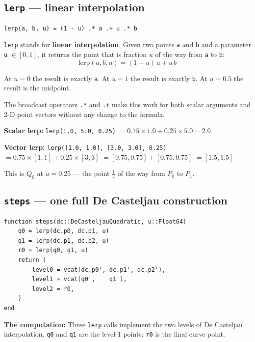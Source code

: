 \documentclass[12pt, a4paper]{article}
\newcommand{\cd}[1]{\texttt{#1}}
\begin{document}
\subsection{\texttt{lerp} --- linear interpolation}

\begin{verbatim}
lerp(a, b, u) = (1 - u) .* a .+ u .* b
\end{verbatim}

\cd{lerp} stands for \textbf{linear interpolation}.
Given two points \cd{a} and \cd{b} and a parameter
\cd{u} $\in [0, 1]$, it returns the point that is fraction
$u$ of the way from \cd{a} to \cd{b}:
\[
  \text{lerp}(a, b, u) = (1-u)\,a + u\,b
\]

At $u=0$ the result is exactly \cd{a}.
At $u=1$ the result is exactly \cd{b}.
At $u=0.5$ the result is the midpoint.

The broadcast operators \cd{.*} and \cd{.+} make this work
for both scalar arguments and 2-D point vectors without
any change to the formula.

\begin{examplebox}
\textbf{Scalar lerp:} \cd{lerp(1.0, 5.0, 0.25)}
$= 0.75 \times 1.0 + 0.25 \times 5.0 = 2.0$

\textbf{Vector lerp:}
\cd{lerp([1.0, 1.0], [3.0, 3.0], 0.25)}
$= 0.75 \times [1,1] + 0.25 \times [3,3]$
$= [0.75, 0.75] + [0.75, 0.75]$
$= [1.5, 1.5]$

This is $Q_0$ at $u=0.25$ --- the point $\tfrac{1}{4}$ of the
way from $P_0$ to $P_1$.
\end{examplebox}

\subsection{\texttt{steps} --- one full De Casteljau construction}

\begin{verbatim}
function steps(dc::DeCasteljauQuadratic, u::Float64)
    q0 = lerp(dc.p0, dc.p1, u)
    q1 = lerp(dc.p1, dc.p2, u)
    r0 = lerp(q0, q1, u)
    return (
        level0 = vcat(dc.p0', dc.p1', dc.p2'),
        level1 = vcat(q0',    q1'),
        level2 = r0,
    )
end
\end{verbatim}

\textbf{The computation:}
Three \cd{lerp} calls implement the two levels of
De Casteljau interpolation.
\cd{q0} and \cd{q1} are the level-1 points;
\cd{r0} is the final curve point.
\end{document}
